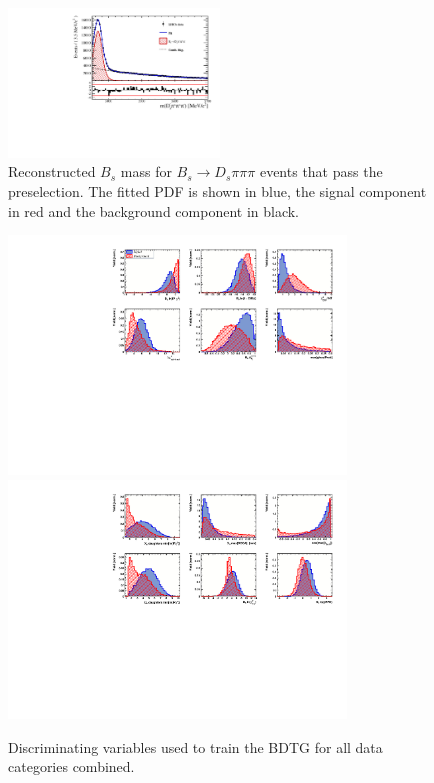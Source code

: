 \begin{figure}[h]
\centering
\includegraphics[height=!,width=0.5\textwidth]{figs/MassFit/norm_preselected_pull.pdf}
\caption{Reconstructed $B_s$ mass for $B_s\to D_s\pi\pi\pi$ events that pass the preselection. The fitted
PDF is shown in blue, the signal component in red and the background component in black.}
\label{fig:massFit_preselected}
\end{figure}
\begin{figure}[h]
\centering
\includegraphics[height=!,width=0.8\textwidth]{figs/TMVA/BDTG_Data_all_all_all/variables_id_c1.pdf}
\includegraphics[height=!,width=0.8\textwidth]{figs/TMVA/BDTG_Data_all_all_all/variables_id_c2.pdf}
\caption{Discriminating variables used to train the BDTG for all data categories combined.}
\label{fig:varsBDT}
\end{figure}

